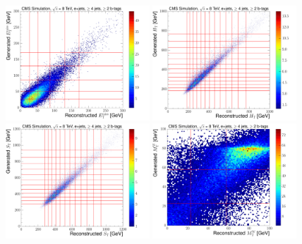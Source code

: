 \begin{figure}[hbtp]
    \centering
     \includegraphics[width=0.48\textwidth]{Chapters/04_Analysis/04b_XSections/images/binning/electron_MET_8TeV.pdf}\hfill
     \includegraphics[width=0.48\textwidth]{Chapters/04_Analysis/04b_XSections/images/binning/electron_HT_8TeV.pdf}\\
     \includegraphics[width=0.48\textwidth]{Chapters/04_Analysis/04b_XSections/images/binning/electron_ST_8TeV.pdf}\hfill
     \includegraphics[width=0.48\textwidth]{Chapters/04_Analysis/04b_XSections/images/binning/electron_MT_8TeV.pdf}\\

\end{figure}
